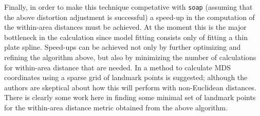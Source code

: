 \documentclass[a4paper,10pt]{article}
\begin{document}
Finally, in order to make this technique competative with \texttt{soap} (assuming that the above distortion adjustment is successful) a speed-up in the computation of the within-area distances must be achieved. At the moment this is the major bottleneck in the calculation since model fitting consists only of fitting a thin plate spline. Speed-ups can be achieved not only by further optimizing and refining the algorithm above, but also by minimizing the number of calculations for within-area distance that are needed. In \cite{landmark} a method to calculate MDS coordinates using a sparse grid of landmark points is suggested; although the authors are skeptical about how this will perform with non-Euclidean distances. There is clearly some work here in finding some minimal set of landmark points for the within-area distance metric obtained from the above algorithm.




\end{document}
